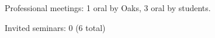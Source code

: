 \begin{tightItemize}
    \item Professional meetings: 1 oral by Oaks, 3 oral by students.
    \item Invited seminars: 0 (6 total)
\end{tightItemize}
